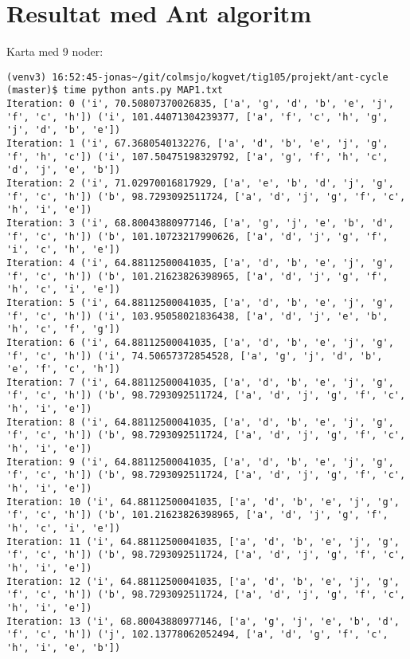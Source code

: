 \documentclass[english,man]{apa6}
\begin{document}
\section{Resultat med Ant algoritm}\label{resultat-med-ant-algoritm}

Karta med 9 noder:

\begin{verbatim}
(venv3) 16:52:45-jonas~/git/colmsjo/kogvet/tig105/projekt/ant-cycle (master)$ time python ants.py MAP1.txt
Iteration: 0 ('i', 70.50807370026835, ['a', 'g', 'd', 'b', 'e', 'j', 'f', 'c', 'h']) ('i', 101.44071304239377, ['a', 'f', 'c', 'h', 'g', 'j', 'd', 'b', 'e'])
Iteration: 1 ('i', 67.3680540132276, ['a', 'd', 'b', 'e', 'j', 'g', 'f', 'h', 'c']) ('i', 107.50475198329792, ['a', 'g', 'f', 'h', 'c', 'd', 'j', 'e', 'b'])
Iteration: 2 ('i', 71.02970016817929, ['a', 'e', 'b', 'd', 'j', 'g', 'f', 'c', 'h']) ('b', 98.7293092511724, ['a', 'd', 'j', 'g', 'f', 'c', 'h', 'i', 'e'])
Iteration: 3 ('i', 68.80043880977146, ['a', 'g', 'j', 'e', 'b', 'd', 'f', 'c', 'h']) ('b', 101.10723217990626, ['a', 'd', 'j', 'g', 'f', 'i', 'c', 'h', 'e'])
Iteration: 4 ('i', 64.88112500041035, ['a', 'd', 'b', 'e', 'j', 'g', 'f', 'c', 'h']) ('b', 101.21623826398965, ['a', 'd', 'j', 'g', 'f', 'h', 'c', 'i', 'e'])
Iteration: 5 ('i', 64.88112500041035, ['a', 'd', 'b', 'e', 'j', 'g', 'f', 'c', 'h']) ('i', 103.95058021836438, ['a', 'd', 'j', 'e', 'b', 'h', 'c', 'f', 'g'])
Iteration: 6 ('i', 64.88112500041035, ['a', 'd', 'b', 'e', 'j', 'g', 'f', 'c', 'h']) ('i', 74.50657372854528, ['a', 'g', 'j', 'd', 'b', 'e', 'f', 'c', 'h'])
Iteration: 7 ('i', 64.88112500041035, ['a', 'd', 'b', 'e', 'j', 'g', 'f', 'c', 'h']) ('b', 98.7293092511724, ['a', 'd', 'j', 'g', 'f', 'c', 'h', 'i', 'e'])
Iteration: 8 ('i', 64.88112500041035, ['a', 'd', 'b', 'e', 'j', 'g', 'f', 'c', 'h']) ('b', 98.7293092511724, ['a', 'd', 'j', 'g', 'f', 'c', 'h', 'i', 'e'])
Iteration: 9 ('i', 64.88112500041035, ['a', 'd', 'b', 'e', 'j', 'g', 'f', 'c', 'h']) ('b', 98.7293092511724, ['a', 'd', 'j', 'g', 'f', 'c', 'h', 'i', 'e'])
Iteration: 10 ('i', 64.88112500041035, ['a', 'd', 'b', 'e', 'j', 'g', 'f', 'c', 'h']) ('b', 101.21623826398965, ['a', 'd', 'j', 'g', 'f', 'h', 'c', 'i', 'e'])
Iteration: 11 ('i', 64.88112500041035, ['a', 'd', 'b', 'e', 'j', 'g', 'f', 'c', 'h']) ('b', 98.7293092511724, ['a', 'd', 'j', 'g', 'f', 'c', 'h', 'i', 'e'])
Iteration: 12 ('i', 64.88112500041035, ['a', 'd', 'b', 'e', 'j', 'g', 'f', 'c', 'h']) ('b', 98.7293092511724, ['a', 'd', 'j', 'g', 'f', 'c', 'h', 'i', 'e'])
Iteration: 13 ('i', 68.80043880977146, ['a', 'g', 'j', 'e', 'b', 'd', 'f', 'c', 'h']) ('j', 102.13778062052494, ['a', 'd', 'g', 'f', 'c', 'h', 'i', 'e', 'b'])

\end{verbatim}
\end{document}

